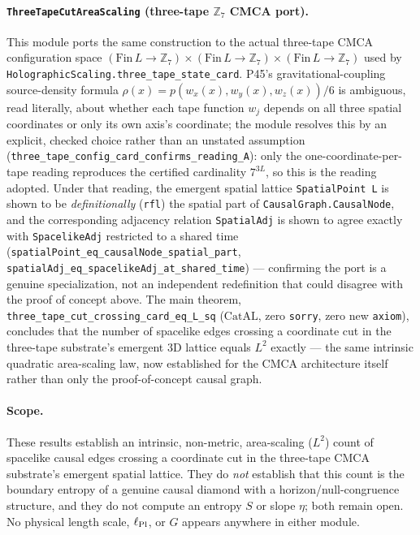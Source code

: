 \documentclass[11pt,a4paper]{article}
\theoremstyle{definition}
\newcommand{\CatAL}{\ensuremath{\mathrm{CatAL}}}
\begin{document}
\paragraph{\texttt{ThreeTapeCutAreaScaling} (three-tape $\mathbb{Z}_7$ CMCA port).}
This module ports the same construction to the actual three-tape CMCA configuration
space $(\mathrm{Fin}\,L \to \mathbb{Z}_7) \times (\mathrm{Fin}\,L \to \mathbb{Z}_7)
\times (\mathrm{Fin}\,L \to \mathbb{Z}_7)$ used by
\lstinline|HolographicScaling.three_tape_state_card|. P45's gravitational-coupling
source-density formula $\rho(x) = p(w_x(x), w_y(x), w_z(x))/6$ is ambiguous, read
literally, about whether each tape function $w_j$ depends on all three spatial
coordinates or only its own axis's coordinate; the module resolves this by an explicit,
checked choice rather than an unstated assumption
(\lstinline|three_tape_config_card_confirms_reading_A|): only the one-coordinate-per-tape
reading reproduces the certified cardinality $7^{3L}$, so this is the reading adopted.
Under that reading, the emergent spatial lattice \lstinline|SpatialPoint L| is shown to
be \emph{definitionally} (\lstinline|rfl|) the spatial part of
\lstinline|CausalGraph.CausalNode|, and the corresponding adjacency relation
\lstinline|SpatialAdj| is shown to agree exactly with \lstinline|SpacelikeAdj| restricted
to a shared time (\lstinline|spatialPoint_eq_causalNode_spatial_part|,
\lstinline|spatialAdj_eq_spacelikeAdj_at_shared_time|) --- confirming the port is a
genuine specialization, not an independent redefinition that could disagree with the
proof of concept above. The main theorem,
\lstinline|three_tape_cut_crossing_card_eq_L_sq| (\CatAL, zero \texttt{sorry}, zero new
\texttt{axiom}), concludes that the number of spacelike edges crossing a coordinate cut
in the three-tape substrate's emergent 3D lattice equals $L^2$ exactly --- the same
intrinsic quadratic area-scaling law, now established for the CMCA architecture itself
rather than only the proof-of-concept causal graph.

\paragraph{Scope.} These results establish an intrinsic, non-metric, area-scaling
($L^2$) count of spacelike causal edges crossing a coordinate cut in the three-tape CMCA
substrate's emergent spatial lattice. They do \emph{not} establish that this count is the
boundary entropy of a genuine causal diamond with a horizon/null-congruence structure, and
they do not compute an entropy $S$ or slope $\eta$; both remain open. No physical length
scale, $\ell_{\rm Pl}$, or $G$ appears anywhere in either module.
\end{document}
